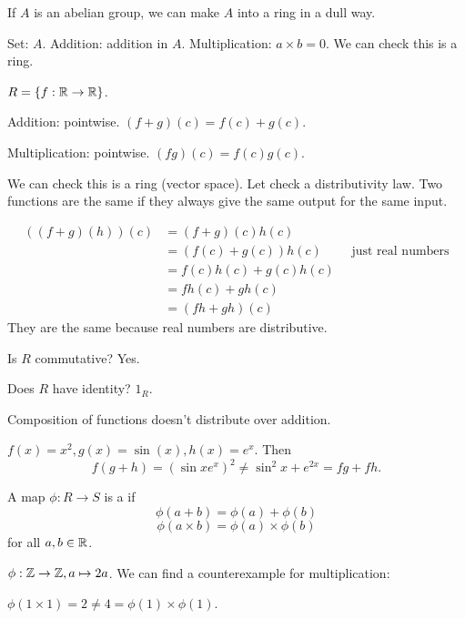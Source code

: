 \documentclass[class=article,crop=false]{standalone}
\begin{document}
\begin{note}[]
If $ A$ is an abelian group, we can make  $ A$ into a ring in a dull way.

Set:  $ A$. Addition: addition in  $ A$. Multiplication:  $ a\times b=0$. We can check this is a ring.
\end{note}
\begin{eg}[]
	$ R=\{f: \mathbb{R} \to \mathbb{R}\} $. 

	Addition: pointwise. $ (f+g)(c)=f(c)+g(c)$.  

	Multiplication: pointwise. $ (fg)(c)=f(c)g(c)$.

	We can check this is a ring (vector space). Let check a distributivity law. Two functions are the same if they always give the same output for the same input.

	 \begin{align*}
		 ((f+g)(h))(c) &=  (f+g)(c) h(c)\\
			       &= (f(c)+g(c))h(c) \qquad \text{ just real numbers} \\
			       &=  f(c)h(c)+g(c)h(c)\\
			       &= fh(c)+gh(c) \\
			       &= (fh+gh)(c) 
	\end{align*}
	They are the same because real numbers are distributive.

Is $ R$ commutative? Yes.

Does $ R$ have identity? $ 1_R$.

\end{eg}
\begin{remark}
	Composition of functions doesn't distribute over addition. 

	$ f(x)=x^2, g(x)=\sin(x ), h(x)=e^{x}$. Then
	\[
		f(g+h)=(\sin x e^{x})^2 \neq \sin^2 x + e^{2x} = fg+fh
	.\] 
\end{remark}

\begin{defn}
A map $ \phi: R \to S$ is a  if
\[
	\phi(a+b) = \phi(a)+\phi(b)
\] 
\[
	\phi(a \times b) = \phi(a) \times \phi(b)
\] 
for all $ a,b \in \mathbb{R}$.
\end{defn}

\begin{eg}[]
	$ \phi: \mathbb{Z} \to \mathbb{Z}, a \mapsto 2a$. We can find a counterexample for multiplication:

	$ \phi(1 \times 1)= 2 \neq 4 = \phi(1) \times \phi(1)$.
\end{eg}
\end{document}
